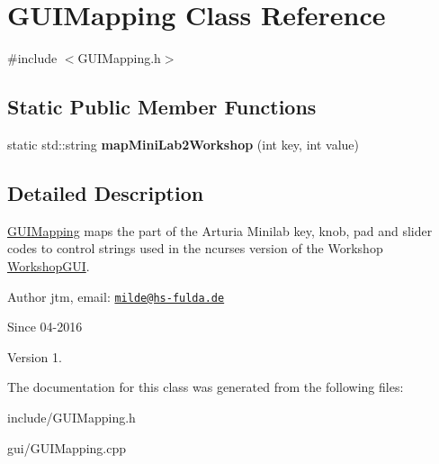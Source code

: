 \hypertarget{classGUIMapping}{\section{G\-U\-I\-Mapping Class Reference}
\label{classGUIMapping}
}


{\ttfamily \#include $<$G\-U\-I\-Mapping.\-h$>$}

\subsection*{Static Public Member Functions}
\begin{DoxyCompactItemize}
\item 
\hypertarget{classGUIMapping_afc4d931e878ba22a7530d39c66c3a966}{static std\-::string {\bfseries map\-Mini\-Lab2\-Workshop} (int key, int value)}\label{classGUIMapping_afc4d931e878ba22a7530d39c66c3a966}

\end{DoxyCompactItemize}


\subsection{Detailed Description}
\hyperlink{classGUIMapping}{G\-U\-I\-Mapping} maps the part of the Arturia Minilab key, knob, pad and slider codes to control strings used in the ncurses version of the Workshop \hyperlink{classWorkshopGUI}{Workshop\-G\-U\-I}.

\begin{DoxyAuthor}{Author}
jtm, email\-:  \href{mailto:milde@hs-fulda.de}{\tt milde@hs-\/fulda.\-de} 
\end{DoxyAuthor}
\begin{DoxySince}{Since}
04-\/2016 
\end{DoxySince}
\begin{DoxyVersion}{Version}
1. 
\end{DoxyVersion}


The documentation for this class was generated from the following files\-:\begin{DoxyCompactItemize}
\item 
include/G\-U\-I\-Mapping.\-h\item 
gui/G\-U\-I\-Mapping.\-cpp\end{DoxyCompactItemize}
